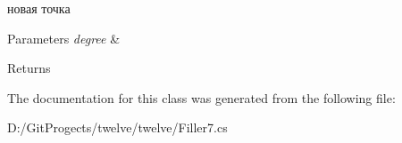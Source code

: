 новая точка 


\begin{DoxyParams}{Parameters}
{\em degree} & \\
\hline
\end{DoxyParams}
\begin{DoxyReturn}{Returns}

\end{DoxyReturn}


The documentation for this class was generated from the following file\+:\begin{DoxyCompactItemize}
\item 
D\+:/\+Git\+Progects/twelve/twelve/Filler7.\+cs\end{DoxyCompactItemize}
